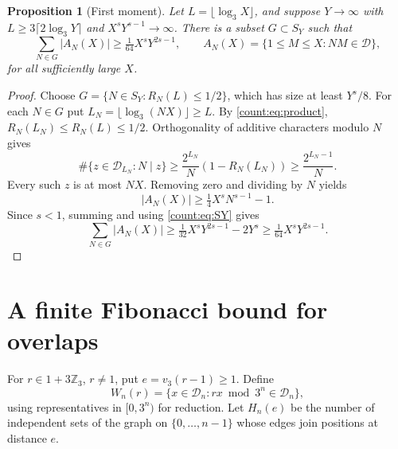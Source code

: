 \documentclass[11pt]{article}
\newtheorem{proposition}[theorem]{Proposition}
\theoremstyle{remark}
\newcommand{\D}{\mathcal D}
\newcommand{\Z}{\mathbb Z}
\begin{document}
\begin{proposition}[First moment]\label{count:prop:first}
Let $L=\lfloor\log_3X\rfloor$, and suppose $Y\to\infty$ with
$L\ge3\lceil2\log_3Y\rceil$ and $X^sY^{s-1}\to\infty$.
There is a subset $G\subset S_Y$ such that
\[
 \sum_{N\in G}|A_N(X)|\ge\tfrac1{64}X^sY^{2s-1},
 \qquad A_N(X)=\{1\le M\le X:NM\in\D\},
\]
for all sufficiently large $X$.
\end{proposition}
\begin{proof}
Choose $G=\{N\in S_Y:R_N(L)\le1/2\}$, which has size at least $Y^s/8$.
For each $N\in G$ put $L_N=\lfloor\log_3(NX)\rfloor\ge L$.
By \eqref{count:eq:product}, $R_N(L_N)\le R_N(L)\le1/2$.
Orthogonality of additive characters modulo $N$ gives
\[
 \#\{z\in\D_{L_N}:N\mid z\}
 \ge\frac{2^{L_N}}N(1-R_N(L_N))\ge\frac{2^{L_N-1}}N.
\]
Every such $z$ is at most $NX$. Removing zero and dividing by $N$ yields
\[
 |A_N(X)|\ge\tfrac14X^sN^{s-1}-1.
\]
Since $s<1$, summing and using \eqref{count:eq:SY} gives
\[
 \sum_{N\in G}|A_N(X)|
 \ge\tfrac1{32}X^sY^{2s-1}-2Y^s
 \ge\tfrac1{64}X^sY^{2s-1}.
\]
\end{proof}

\section{A finite Fibonacci bound for overlaps}

For $r\in1+3\Z_3$, $r\ne1$, put $e=v_3(r-1)\ge1$. Define
\[
 W_n(r)=\{x\in\D_n:rx\bmod3^n\in\D_n\},
\]
using representatives in $[0,3^n)$ for reduction. Let $H_n(e)$ be the
number of independent sets of the graph on $\{0,\ldots,n-1\}$ whose
edges join positions at distance $e$.
\end{document}
